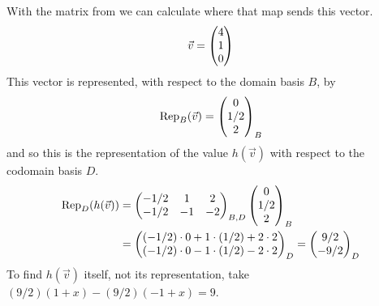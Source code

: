 \begin{example}
With the matrix from 
we can calculate where that map sends this vector.
\begin{equation*}
  \vec{v}=\colvec{4 \\ 1 \\ 0}
\end{equation*}
This vector is represented, with respect to the domain basis $B$, by
\begin{equation*}
  \rep{\vec{v}}{B}=\colvec{0 \\ 1/2 \\ 2}_B
\end{equation*}
and so this is the representation of the value $h(\vec{v})$ with respect to
the codomain basis $D$.
\begin{align*}
  \rep{h(\vec{v})}{D}
  &=\begin{pmatrix}
      -1/2  &1   &2  \\
      -1/2  &-1  &-2
    \end{pmatrix}_{B,D}
    \colvec{0 \\ 1/2 \\ 2}_B                            \\
  &=\colvec{(-1/2)\cdot 0+1\cdot (1/2) + 2\cdot 2 \\ 
          (-1/2)\cdot 0-1\cdot (1/2) - 2\cdot 2}_D
  =\colvec{9/2 \\ -9/2}_D
\end{align*}
To find $h(\vec{v})$ itself, not its representation,
take $(9/2)(1+x)-(9/2)(-1+x)=9$.
\end{example}

